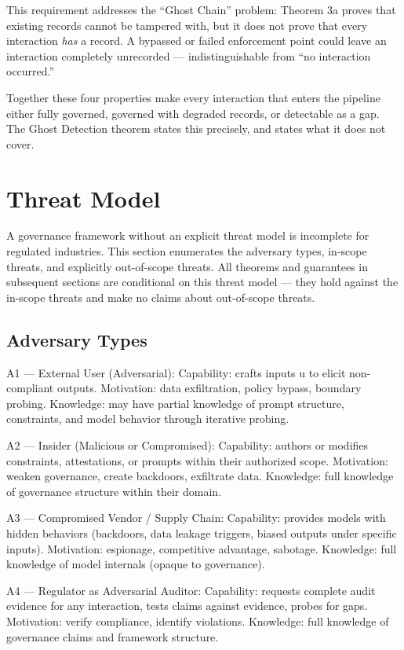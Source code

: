 This requirement addresses the ``Ghost Chain'' problem: Theorem 3a proves that existing records cannot be tampered with, but it does not prove that every interaction \emph{has} a record. A bypassed or failed enforcement point could leave an interaction completely unrecorded --- indistinguishable from ``no interaction occurred.''

Together these four properties make every interaction that enters the pipeline
either fully governed, governed with degraded records, or detectable as a gap.
The Ghost Detection theorem states this precisely, and states what it does not
cover.




\section{Threat Model}
\label{sec:framework-2}


A governance framework without an explicit threat model is incomplete for regulated industries. This section enumerates the adversary types, in-scope threats, and explicitly out-of-scope threats. All theorems and guarantees in subsequent sections are conditional on this threat model --- they hold against the in-scope threats and make no claims about out-of-scope threats.

\subsection{Adversary Types}


\begin{cdef}
A1 --- External User (Adversarial): Capability: crafts inputs u to elicit non-compliant outputs. Motivation: data exfiltration, policy bypass, boundary probing. Knowledge: may have partial knowledge of prompt structure, constraints, and model behavior through iterative probing.

A2 --- Insider (Malicious or Compromised): Capability: authors or modifies constraints, attestations, or prompts within their authorized scope. Motivation: weaken governance, create backdoors, exfiltrate data. Knowledge: full knowledge of governance structure within their domain.

A3 --- Compromised Vendor / Supply Chain: Capability: provides models with hidden behaviors (backdoors, data leakage triggers, biased outputs under specific inputs). Motivation: espionage, competitive advantage, sabotage. Knowledge: full knowledge of model internals (opaque to governance).

A4 --- Regulator as Adversarial Auditor: Capability: requests complete audit evidence for any interaction, tests claims against evidence, probes for gaps. Motivation: verify compliance, identify violations. Knowledge: full knowledge of governance claims and framework structure.

\end{cdef}


